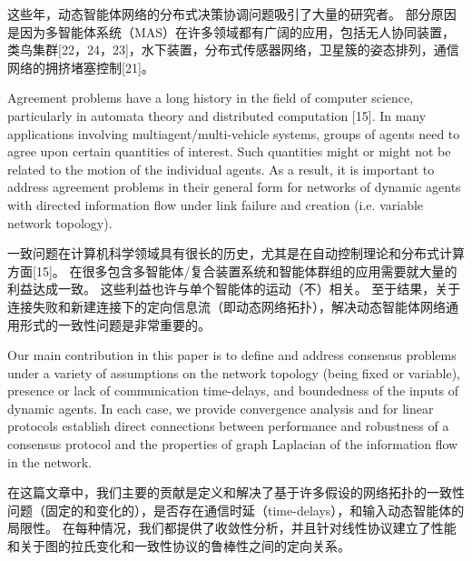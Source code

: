 \documentclass{article}
\begin{document}
\noindent 这些年，动态智能体网络的分布式决策协调问题吸引了大量的研究者。
部分原因是因为多智能体系统（MAS）在许多领域都有广阔的应用，包括无人协同装置，类鸟集群[22，24，23]，水下装置，分布式传感器网络，卫星簇的姿态排列，通信网络的拥挤堵塞控制[21]。

{\color[gray]{0.5}
Agreement problems have a long history in the ﬁeld of computer science, particularly in automata theory and distributed computation [15]. 
In many applications involving multiagent/multi-vehicle systems, groups of agents need to agree upon certain quantities of {\color{green}interest}. 
Such quantities might or might not be related to the motion of the individual agents. 
As a result, it is important to address agreement problems in their general form for networks of dynamic agents with directed information ﬂow under link failure and creation (i.e. variable network topology).
}

一致问题在计算机科学领域具有很长的历史，尤其是在自动控制理论和分布式计算方面[15]。
在很多包含多智能体/复合装置系统和智能体群组的应用需要就大量的利益达成一致。
这些利益也许与单个智能体的运动（不）相关。
至于结果，关于连接失败和新建连接下的定向信息流（即动态网络拓扑），解决动态智能体网络通用形式的一致性问题是非常重要的。

{\color[gray]{0.5}
Our main contribution in this paper is to deﬁne and address consensus problems under a variety of assumptions on the network topology (being ﬁxed or variable), presence or lack of communication time-delays, and boundedness of the inputs of dynamic agents. 
In each case, we provide convergence analysis and for linear protocols establish direct connections between performance and robustness of a consensus protocol and the properties of graph Laplacian of the information ﬂow in the network.
}

在这篇文章中，我们主要的贡献是定义和解决了基于许多假设的网络拓扑的一致性问题（固定的和变化的），是否存在通信时延（time-delays），和输入动态智能体的局限性。
在每种情况，我们都提供了收敛性分析，并且针对线性协议建立了性能和关于图的拉氏变化和一致性协议的鲁棒性之间的定向关系。
\end{document}
